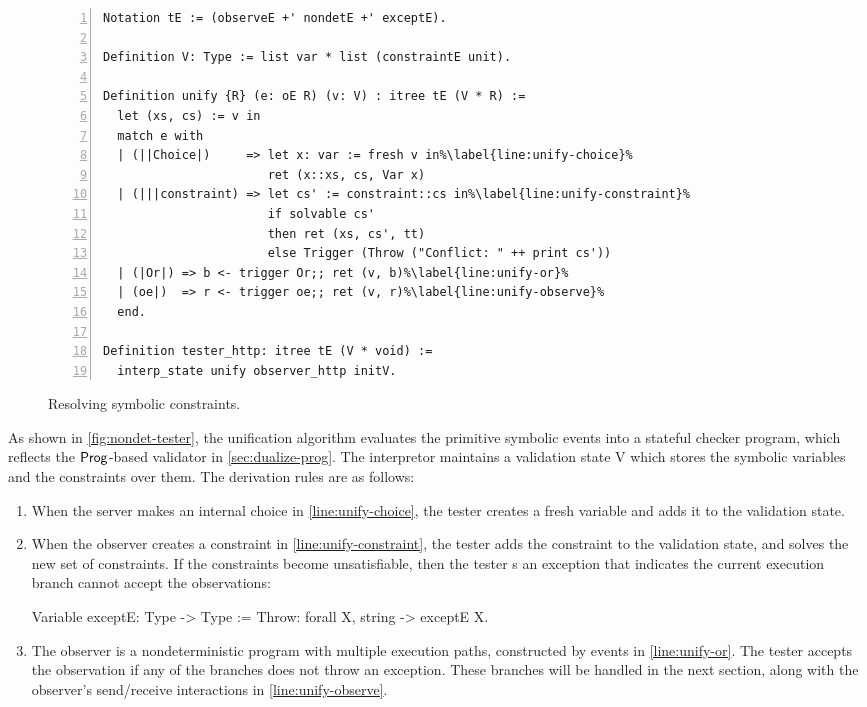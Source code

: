 \begin{figure}
\begin{lstlisting}[style=customcoq,numbers=left,escapechar=\%]
Notation tE := (observeE +' nondetE +' exceptE).

Definition V: Type := list var * list (constraintE unit).
  
Definition unify {R} (e: oE R) (v: V) : itree tE (V * R) :=
  let (xs, cs) := v in
  match e with
  | (||Choice|)     => let x: var := fresh v in%\label{line:unify-choice}%
                       ret (x::xs, cs, Var x)
  | (|||constraint) => let cs' := constraint::cs in%\label{line:unify-constraint}%
                       if solvable cs'
                       then ret (xs, cs', tt)
                       else Trigger (Throw ("Conflict: " ++ print cs'))
  | (|Or|) => b <- trigger Or;; ret (v, b)%\label{line:unify-or}%
  | (oe|)  => r <- trigger oe;; ret (v, r)%\label{line:unify-observe}%
  end.

Definition tester_http: itree tE (V * void) :=
  interp_state unify observer_http initV.
\end{lstlisting}
\caption{Resolving symbolic constraints.}
\label{fig:nondet-tester}
\end{figure}

As shown in \autoref{fig:nondet-tester}, the unification algorithm evaluates the
primitive symbolic events into a stateful checker program, which reflects the
$\mathsf{Prog}$-based validator in \autoref{sec:dualize-prog}.  The interpretor
maintains a validation state \ilc V which stores the symbolic variables and the
constraints over them.  The derivation rules are as follows:
\begin{enumerate}
  \item When the server makes an internal choice in \autoref{line:unify-choice},
    the tester creates a fresh variable and adds it to the validation state.
  \item When the observer creates a constraint in
    \autoref{line:unify-constraint}, the tester adds the constraint to the
    validation state, and solves the new set of constraints.  If the constraints
    become unsatisfiable, then the tester s an exception that
    indicates the current execution branch cannot accept the observations:
\begin{coq}
  Variable exceptE: Type -> Type :=
    Throw: forall {X}, string -> exceptE X.
\end{coq}      
  \item The observer is a nondeterministic program with multiple execution
    paths, constructed by  events in \autoref{line:unify-or}.  The
    tester accepts the observation if any of the branches does not throw an
    exception.  These branches will be handled in the next section, along with
    the observer's send/receive interactions in \autoref{line:unify-observe}.
\end{enumerate}


